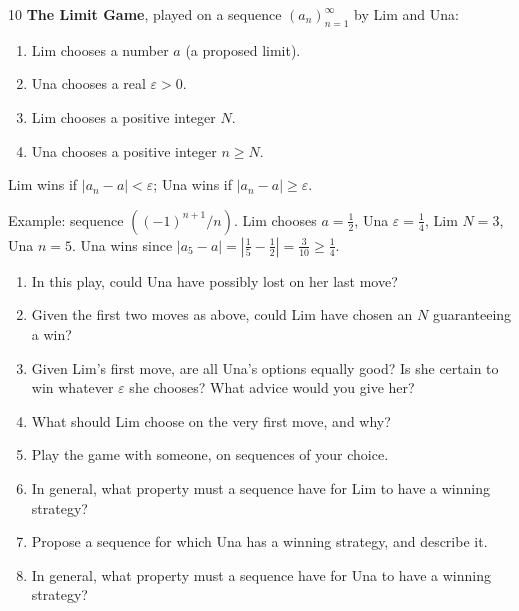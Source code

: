 \begin{exercise}{10}
    \textbf{The Limit Game}, played on a sequence $(a_n)_{n=1}^\infty$ by Lim and
    Una:
    \begin{enumerate}[label=\arabic*.]
        \item Lim chooses a number $a$ (a proposed limit).
        \item Una chooses a real $\varepsilon>0$.
        \item Lim chooses a positive integer $N$.
        \item Una chooses a positive integer $n\ge N$.
    \end{enumerate}
    Lim wins if $|a_n-a|<\varepsilon$; Una wins if $|a_n-a|\ge\varepsilon$.

    Example: sequence $((-1)^{n+1}/n)$. Lim chooses $a=\frac12$, Una
    $\varepsilon=\frac14$, Lim $N=3$, Una $n=5$. Una wins since
    $|a_5-a|=|\frac15-\frac12|=\frac3{10}\ge\frac14$.
    \begin{enumerate}[label=(\alph*)]
        \item In this play, could Una have possibly lost on her last move?
        \item Given the first two moves as above, could Lim have chosen an $N$
              guaranteeing a win?
        \item Given Lim's first move, are all Una's options equally good? Is she
              certain to win whatever $\varepsilon$ she chooses? What advice
              would you give her?
        \item What should Lim choose on the very first move, and why?
        \item Play the game with someone, on sequences of your choice.
        \item In general, what property must a sequence have for Lim to have a
              winning strategy?
        \item Propose a sequence for which Una has a winning strategy, and
              describe it.
        \item In general, what property must a sequence have for Una to have a
              winning strategy?
    \end{enumerate}
\end{exercise}

